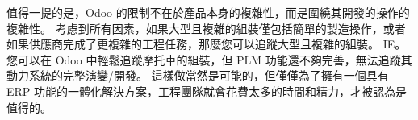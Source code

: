 \fontsize{12pt}{2.5pt}\selectfont
{值得一提的是，Odoo 的限制不在於產品本身的複雜性，而是圍繞其開發的操作的複雜性。 考慮到所有因素，如果大型且複雜的組裝僅包括簡單的製造操作，或者如果供應商完成了更複雜的工程任務，那麼您可以追蹤大型且複雜的組裝。 IE。 您可以在 Odoo 中輕鬆追蹤摩托車的組裝，但 PLM 功能還不夠完善，無法追蹤其動力系統的完整演變/開發。 這樣做當然是可能的，但僅僅為了擁有一個具有 ERP 功能的一體化解決方案，工程團隊就會花費太多的時間和精力，才被認為是值得的。}\\[1pt]
